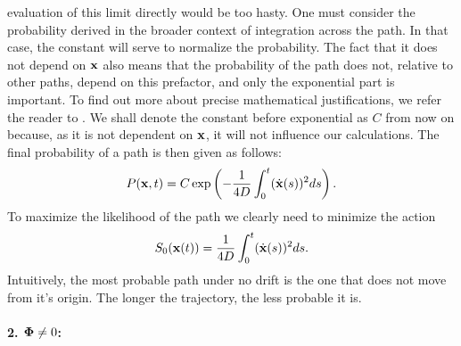 evaluation of this limit directly would be too hasty. One must consider the probability derived in the broader context of integration across the path. In that case, the constant will serve to normalize the probability. The fact that it does not depend on $\mathbf{x}$ also means that the probability of the path does not, relative to other paths, depend on this prefactor, and only the exponential part is important. To find out more about precise mathematical justifications, we refer the reader to \cite{gelfand-yaglom}. We shall denote the constant before exponential as $C$ from now on because, as it is not dependent on $\mathbf{x}$, it will not influence our calculations. The final probability of a path is then given as follows:
\begin{equation}
    P(\mathbf{x},t) = C \exp \left( - \frac{1}{4D} \int_0^t (\dot{\mathbf{x}}(s))^2 ds \right).
\end{equation}
To maximize the likelihood of the path we clearly need to minimize the action
\begin{equation}
    S_0(\mathbf{x}(t)) = \frac{1}{4D} \int_0^t (\dot{\mathbf{x}}(s))^2 ds.
\end{equation}
Intuitively, the most probable path under no drift is the one that does not move from it's origin. The longer the trajectory, the less probable it is.
\paragraph{2. $\mathbf{\Phi} \neq 0$:} \

